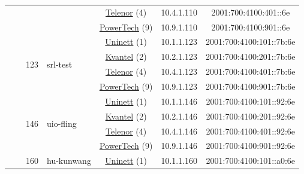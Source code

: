 \begin{small}
\begin{center}
\begin{longtable}{|c|c|c|c|c|c|c|c|}
  &  & \multicolumn{2}{|c|}{} & \multicolumn{2}{|c|}{\tiny{\href{https://www.telenor.no}{Telenor} (4)}} & \tiny{10.4.1.110} & \tiny{2001:700:4100:401::6e} \\* \cline{5-5}\cline{6-6}\cline{7-7}\cline{8-8}
  &  & \multicolumn{2}{|c|}{} & \multicolumn{2}{|c|}{\tiny{\href{http://www.powertech.no}{PowerTech} (9)}} & \tiny{10.9.1.110} & \tiny{2001:700:4100:901::6e} \\* \cline{3-3}\cline{4-4}\cline{5-5}\cline{6-6}\cline{7-7}\cline{8-8}
  &  & \multirow{4}{*}{\tiny{123}} & \multicolumn{1}{|l|}{\multirow{4}{*}{\tiny{srl-test}}} & \multicolumn{2}{|c|}{\tiny{\href{https://www.uninett.no}{Uninett} (1)}} & \tiny{10.1.1.123} & \tiny{2001:700:4100:101::7b:6e} \\* \cline{5-5}\cline{6-6}\cline{7-7}\cline{8-8}
  &  &  &  & \multicolumn{2}{|c|}{\tiny{\href{http://kvantel.no}{Kvantel} (2)}} & \tiny{10.2.1.123} & \tiny{2001:700:4100:201::7b:6e} \\* \cline{5-5}\cline{6-6}\cline{7-7}\cline{8-8}
  &  &  &  & \multicolumn{2}{|c|}{\tiny{\href{https://www.telenor.no}{Telenor} (4)}} & \tiny{10.4.1.123} & \tiny{2001:700:4100:401::7b:6e} \\* \cline{5-5}\cline{6-6}\cline{7-7}\cline{8-8}
  &  &  &  & \multicolumn{2}{|c|}{\tiny{\href{http://www.powertech.no}{PowerTech} (9)}} & \tiny{10.9.1.123} & \tiny{2001:700:4100:901::7b:6e} \\* \cline{3-3}\cline{4-4}\cline{5-5}\cline{6-6}\cline{7-7}\cline{8-8}
  &  & \multirow{4}{*}{\tiny{146}} & \multicolumn{1}{|l|}{\multirow{4}{*}{\tiny{uio-fling}}} & \multicolumn{2}{|c|}{\tiny{\href{https://www.uninett.no}{Uninett} (1)}} & \tiny{10.1.1.146} & \tiny{2001:700:4100:101::92:6e} \\* \cline{5-5}\cline{6-6}\cline{7-7}\cline{8-8}
  &  &  &  & \multicolumn{2}{|c|}{\tiny{\href{http://kvantel.no}{Kvantel} (2)}} & \tiny{10.2.1.146} & \tiny{2001:700:4100:201::92:6e} \\* \cline{5-5}\cline{6-6}\cline{7-7}\cline{8-8}
  &  &  &  & \multicolumn{2}{|c|}{\tiny{\href{https://www.telenor.no}{Telenor} (4)}} & \tiny{10.4.1.146} & \tiny{2001:700:4100:401::92:6e} \\* \cline{5-5}\cline{6-6}\cline{7-7}\cline{8-8}
  &  &  &  & \multicolumn{2}{|c|}{\tiny{\href{http://www.powertech.no}{PowerTech} (9)}} & \tiny{10.9.1.146} & \tiny{2001:700:4100:901::92:6e} \\* \cline{3-3}\cline{4-4}\cline{5-5}\cline{6-6}\cline{7-7}\cline{8-8}
  &  & \multirow{4}{*}{\tiny{160}} & \multicolumn{1}{|l|}{\multirow{4}{*}{\tiny{hu-kunwang}}} & \multicolumn{2}{|c|}{\tiny{\href{https://www.uninett.no}{Uninett} (1)}} & \tiny{10.1.1.160} & \tiny{2001:700:4100:101::a0:6e} \\* \cline{5-5}\cline{6-6}\cline{7-7}\cline{8-8}

\end{longtable}
\end{center}
\end{small}
